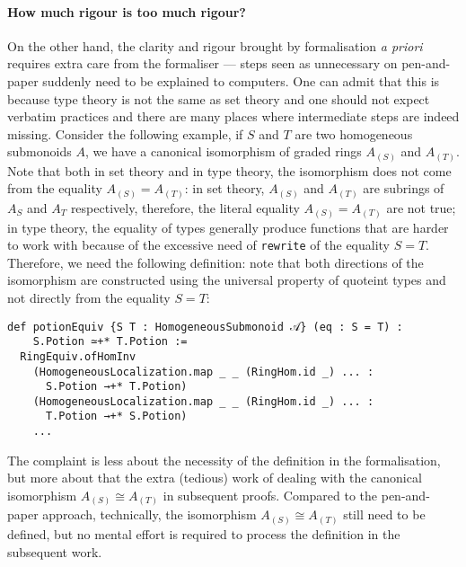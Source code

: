 \documentclass[graybox]{svmult}
\begin{document}
\paragraph{How much rigour is too much rigour?}%
On the other hand, the clarity and rigour brought by formalisation \textit{a priori} requires extra 
care from the formaliser --- steps seen as unnecessary on pen-and-paper suddenly need to 
be explained to computers. One can admit that this is because type theory is not the same as set theory and 
one should not expect verbatim practices and there are many places where intermediate steps are indeed missing.
Consider the following example, if $S$ and $T$ are two homogeneous submonoids $A$, we have a canonical isomorphism of graded rings
$A_{(S)}$ and $A_{(T)}$. 
Note that both in set theory and in type theory, the isomorphism does not come from the equality $A_{(S)} = A_{(T)}$:
in set theory, $A_{(S)}$ and $A_{(T)}$ are subrings of $A_S$ and $A_T$ respectively,  
therefore, the literal equality $A_{(S)} = A_{(T)}$ are not true; 
in type theory, the equality of types generally produce functions that are harder to work with because of the excessive need of \lstinline|rewrite| of the equality $S = T$.
Therefore, we need the following definition: note that both directions of the isomorphism are constructed
using the universal property of quoteint types and not directly from the equality $S = T$:
\begin{lstlisting}
def potionEquiv {S T : HomogeneousSubmonoid 𝒜} (eq : S = T) : 
    S.Potion ≃+* T.Potion := 
  RingEquiv.ofHomInv
    (HomogeneousLocalization.map _ _ (RingHom.id _) ... : 
      S.Potion →+* T.Potion)
    (HomogeneousLocalization.map _ _ (RingHom.id _) ... : 
      T.Potion →+* S.Potion)
    ...
\end{lstlisting}
The complaint is less about the necessity of the definition in the formalisation, but more about that 
the extra (tedious) work of dealing with the canonical isomorphism $A_{(S)} \cong A_{(T)}$ in subsequent proofs.
Compared to the pen-and-paper approach, technically, the isomorphism $A_{(S)} \cong A_{(T)}$ still need to be defined, 
but no mental effort is required to process the definition in the subsequent work.
\end{document}
